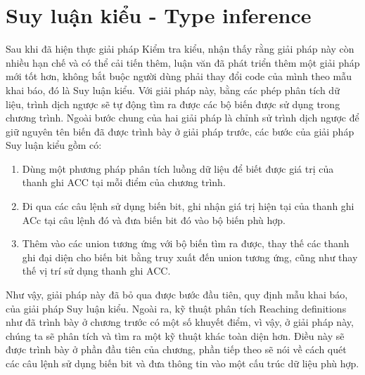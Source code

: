 \chapter{Suy luận kiểu - Type inference}
Sau khi đã hiện thực giải pháp Kiểm tra kiểu, nhận thấy rằng giải pháp này còn nhiều hạn chế và có thể cải tiến thêm, luận văn đã phát triển thêm một giải pháp mới tốt hơn, không bắt buộc người dùng phải thay đổi code của mình theo mẫu khai báo, đó là Suy luận kiểu. Với giải pháp này, bằng các phép phân tích dữ liệu, trình dịch ngược sẽ tự động tìm ra được các bộ biến được sử dụng trong chương trình. Ngoài bước chung của hai giải pháp là chỉnh sử trình dịch ngược để giữ nguyên tên biến đã được trình bày ở giải pháp trước, các bước của giải pháp Suy luận kiểu gồm có:
\begin{enumerate}
	\item Dùng một phương pháp phân tích luồng dữ liệu để biết được giá trị của thanh ghi ACC tại mỗi điểm của chương trình.
	\item Đi qua các câu lệnh sử dụng biến bit, ghi nhận giá trị hiện tại của thanh ghi ACc tại câu lệnh đó và đưa biến bit đó vào bộ biến phù hợp.
	\item Thêm vào các union tương ứng với bộ biến tìm ra được, thay thế các thanh ghi đại diện cho biến bit bằng truy xuất đến union tương ứng, cũng như thay thế vị trí sử dụng thanh ghi ACC.
\end{enumerate}
Như vậy, giải pháp này đã bỏ qua được bước đầu tiên, quy định mẫu khai báo, của giải pháp Suy luận kiểu. Ngoài ra, kỹ thuật phân tích Reaching definitions như đã trình bày ở chương trước có một số khuyết điểm, vì vậy, ở giải pháp này, chúng ta sẽ phân tích và tìm ra một kỹ thuật khác toàn diện hơn. Điều này sẽ được trình bày ở phần đầu tiên của chương, phần tiếp theo sẽ nói về cách quét các câu lệnh sử dụng biến bit và đưa thông tin vào một cấu trúc dữ liệu phù hợp.


